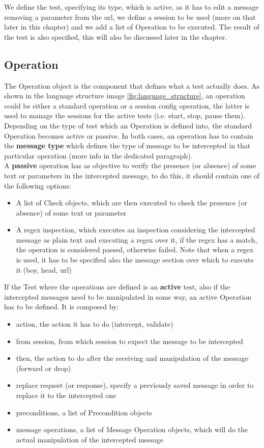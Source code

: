 We define the test, specifying its type, which is active, as it has to edit a message removing a parameter from the url, we define a session to be used (more on that later in this chapter) and we add a list of Operation to be executed. The result of the test is also specified, this will also be discussed later in the chapter.

\subsection{Operation}
The Operation object is the component that defines what a test actually does. As shown in the language structure image \ref{fig:language_structure}, an operation could be either a standard operation or a session config operation, the latter is used to manage the sessions for the active tests (i.e. start, stop, pause them). Depending on the type of test which an Operation is defined into, the standard Operation becomes active or passive.
In both cases, an operation has to contain the \textbf{message type} which defines the type of message to be intercepted in that particular operation (more info in the dedicated paragraph).
\\A \textbf{passive} operation has as objective to verify the presence (or absence) of some text or parameters in the intercepted message, to do this, it should contain one of the following options:
\begin{itemize}
    \item A list of Check objects, which are then executed to check the presence (or absence) of some text or parameter
    \item A regex inspection, which executes an inspection considering the intercepted message as plain text and executing a regex over it, if the regex has a match, the operation is considered passed, otherwise failed. Note that when a regex is used, it has to be specified also the message section over which to execute it (boy, head, url)
\end{itemize}

If the Test where the operations are defined is an \textbf{active} test, also if the intercepted messages need to be manipulated in some way, an active Operation has to be defined. It is composed by:
\begin{itemize}
    \item action, the action it has to do (intercept, validate)
    \item from session, from which session to expect the message to be intercepted
    \item then, the action to do after the receiving and manipulation of the message (forward or drop)
    \item replace request (or response), specify a previously saved message in order to replace it to the intercepted one
    \item preconditions, a list of Precondition objects
    \item message operations, a list of Message Operation objects, which will do the actual manipulation of the intercepted message
\end{itemize}

